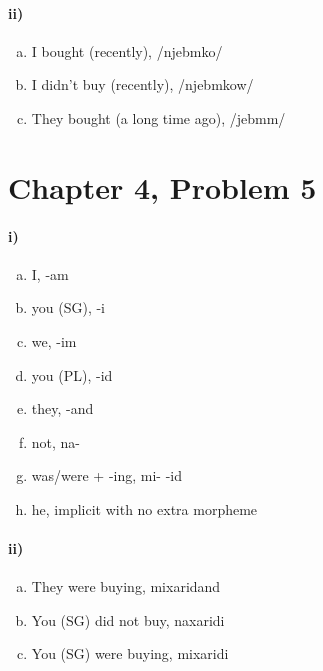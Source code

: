 \documentclass[12pt]{article}
\begin{document}
\pagebreak
\paragraph{ii)}

\begin{enumerate}[a)]
    \item I bought (recently), /njeb\textopeno mko/
    \item I didn't buy (recently), /njeb\textopeno mkow\textepsilon\textepsilon/
    \item They bought (a long time ago), /jeb\textopeno mm\textepsilon/
\end{enumerate}

\section*{Chapter 4, Problem 5}

\paragraph{i)}

\begin{multicols}{2}
    \begin{enumerate}[a)]
        \item I, -am
        \item you (SG), -i
        \item we, -im
        \item you (PL), -id
        \item they, -and
        \item not, na-
        \item was/were + -ing, mi- -id
        \item he, implicit with no extra morpheme
    \end{enumerate}
\end{multicols}

\paragraph{ii)}

\begin{enumerate}[a)]
    \item They were buying, mixaridand
    \item You (SG) did not buy, naxaridi
    \item You (SG) were buying, mixaridi
\end{enumerate}
\end{document}
